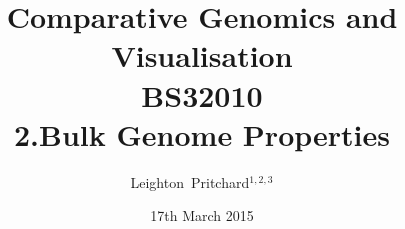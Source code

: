 

%



\title[Comparative Genomics and Visualisation: 2.Bulk Properties] %
{Comparative Genomics and \\ Visualisation \\
BS32010 \\
2.Bulk Genome Properties}
\author[Pritchard] %
{Leighton~Pritchard$^{1,2,3}$}
\date[17th March 2015] %
{17th March 2015}
\subject{Bioinformatics, Genomics, Bacteria, Sequencing, Microbiology, Microbes, Comparative Genomics, Visualisation}





\frame[plain]{\titlepage}








